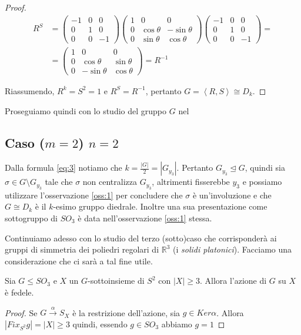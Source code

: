 \begin{proof}
\begin{equation*}
\begin{split}
R^S & =\left(\begin{array}{ccc}
-1 & 0 & 0\\
0 & 1 & 0\\
0 & 0 & -1
\end{array}\right)
\left(\begin{array}{ccc}
1 & 0 & 0\\
0 & \cos{\theta} & -\sin{\theta}\\
0 & \sin{\theta} & \cos{\theta}
\end{array}\right)
\left(\begin{array}{ccc}
-1 & 0 & 0\\
0 & 1 & 0\\
0 & 0 & -1
\end{array}\right)=\\
& =\left(\begin{array}{ccc}
1 & 0 & 0\\
0 & \cos{\theta} & \sin{\theta}\\
0 & -\sin{\theta} & \cos{\theta}
\end{array}\right)=R^{-1}
\end{split}
\end{equation*}

Riassumendo, $R^k=S^2=1$ e $R^S=R^{-1}$, pertanto $G=\left<R,S\right>\cong D_k$.
\end{proof}
Proseguiamo quindi con lo studio del gruppo $G$ nel
\subsection{Caso ($m=2$) $n=2$}
Dalla formula \ref{eq:3} notiamo che $k=\frac{\left|G\right|}{2}=\left|G_{y_3}\right|$. Pertanto $G_{y_3}\trianglelefteq G$,
quindi sia $\sigma\in G\setminus G_{y_3}$ tale che $\sigma$ non centralizza $G_{y_3}$, altrimenti fisserebbe $y_3$ e possiamo
utilizzare l'osservazione \ref{oss:1} per concludere che $\sigma$ \`e un'involuzione e che $G\cong D_k$ \`e il $k$-esimo gruppo
diedrale.
Inoltre una sua presentazione come sottogruppo di $SO_3$ \`e data nell'osservazione \ref{oss:1} stessa.

Continuiamo adesso con lo studio del terzo (sotto)caso che corrisponder\`a ai gruppi di simmetria dei poliedri regolari
di $\mathbb{R}^3$ (i \emph{solidi platonici}).
Facciamo una considerazione che ci sar\`a a tal fine utile.
\begin{oss} \label{oss:2}
Sia $G\leq SO_3$ e $X$ un $G$-sottoinsieme di $S^2$ con $\left|X\right|\geq 3$. Allora l'azione di $G$ su $X$ \`e fedele.
\end{oss}
\begin{proof}
Se $G\overset{\alpha}\longrightarrow S_X$ \`e la restrizione dell'azione, sia $g\in Ker\alpha$. Allora
$\left|Fix_{S^2}g\right|=\left|X\right|\geq 3$ quindi, essendo $g\in SO_3$ abbiamo $g=1$
\end{proof}

